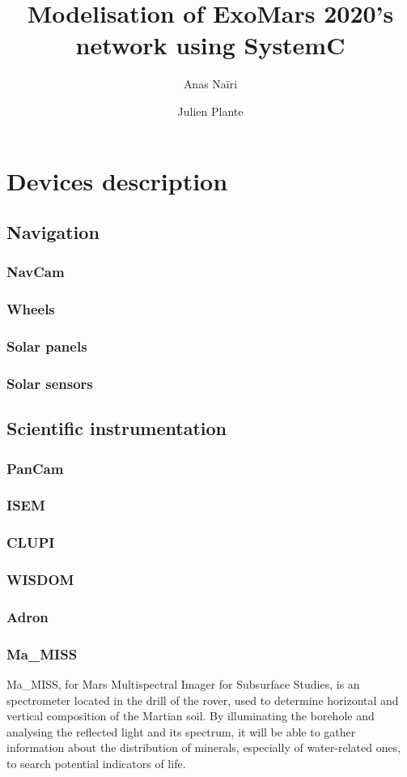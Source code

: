 \documentclass[12pt,a4paper]{article}
\author{Anas Naïri \and Julien Plante}
\title{Modelisation of ExoMars 2020's network using SystemC}
\begin{document}
\maketitle

\section{Devices description}
\subsection{Navigation}
\subsubsection{NavCam}
\subsubsection{Wheels}
\subsubsection{Solar panels}
\subsubsection{Solar sensors}

\pagebreak
\subsection{Scientific instrumentation}
\subsubsection{PanCam}
\subsubsection{ISEM}
\subsubsection{CLUPI}
\subsubsection{WISDOM}
\subsubsection{Adron}
\subsubsection{Ma\_MISS}
Ma\_MISS, for Mars Multispectral Imager for Subsurface Studies, is an spectrometer located in the drill of the rover, used to determine horizontal and vertical composition of the Martian soil. By illuminating the borehole and analysing the reflected light and its spectrum, it will be able to gather information about the distribution of minerals, especially of water-related ones, to search potential indicators of life.
\end{document}
